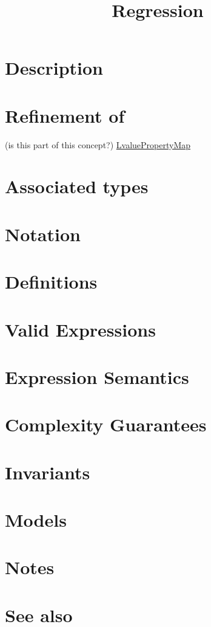 \documentclass{article}
\begin{document}
\title{Regression}
\maketitle

\section*{Description}

\begin{figure}
\end{figure}


\section*{Refinement of}

(is this part of this concept?)
\href{http://www.boost.org/libs/property_map/LvaluePropertyMap.html}{LvaluePropertyMap}

\section*{Associated types}
\section*{Notation}
\section*{Definitions}
\section*{Valid Expressions}
\section*{Expression Semantics}
\section*{Complexity Guarantees}
\section*{Invariants}
\section*{Models}
\section*{Notes}
\section*{See also}




\end{document}
